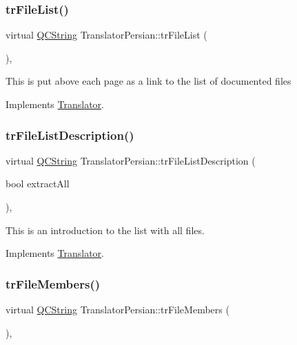 \subsubsection{\texorpdfstring{trFileList()}{trFileList()}}
{\footnotesize\ttfamily virtual \mbox{\hyperlink{class_q_c_string}{Q\+C\+String}} Translator\+Persian\+::tr\+File\+List (\begin{DoxyParamCaption}{ }\end{DoxyParamCaption})\hspace{0.3cm}{\ttfamily [inline]}, {\ttfamily [virtual]}}

This is put above each page as a link to the list of documented files 

Implements \mbox{\hyperlink{class_translator}{Translator}}.

\mbox{\label{class_translator_persian_a116c293ed9aa27d912d194ab2f3643ae}} 
\subsubsection{\texorpdfstring{trFileListDescription()}{trFileListDescription()}}
{\footnotesize\ttfamily virtual \mbox{\hyperlink{class_q_c_string}{Q\+C\+String}} Translator\+Persian\+::tr\+File\+List\+Description (\begin{DoxyParamCaption}\item[{bool}]{extract\+All }\end{DoxyParamCaption})\hspace{0.3cm}{\ttfamily [inline]}, {\ttfamily [virtual]}}

This is an introduction to the list with all files. 

Implements \mbox{\hyperlink{class_translator}{Translator}}.

\mbox{\label{class_translator_persian_ae2e04aaeaa466f4738ec0a4eecd0993c}} 
\subsubsection{\texorpdfstring{trFileMembers()}{trFileMembers()}}
{\footnotesize\ttfamily virtual \mbox{\hyperlink{class_q_c_string}{Q\+C\+String}} Translator\+Persian\+::tr\+File\+Members (\begin{DoxyParamCaption}{ }\end{DoxyParamCaption})\hspace{0.3cm}{\ttfamily [inline]}, {\ttfamily [virtual]}}

